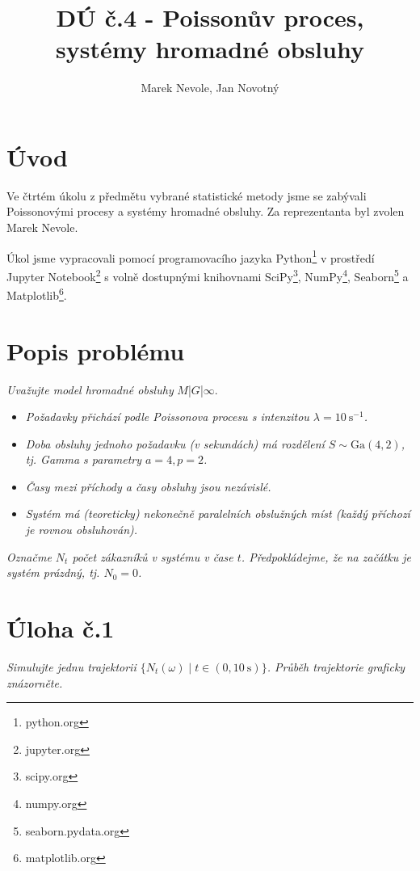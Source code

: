 \documentclass[czech]{mvi-report}
\title{DÚ č.4 - Poissonův proces, systémy hromadné obsluhy}
\author{Marek Nevole, Jan Novotný}
\affiliation{ČVUT - FIT}
\begin{document}
\maketitle

\section{Úvod}
Ve čtrtém úkolu z předmětu vybrané statistické metody jsme se zabývali Poissonovými procesy a systémy hromadné obsluhy. Za reprezentanta byl zvolen Marek Nevole.

Úkol jsme vypracovali pomocí programovacího jazyka Python\footnote{python.org} v prostředí Jupyter Notebook\footnote{jupyter.org} s volně dostupnými knihovnami SciPy\footnote{scipy.org}, NumPy\footnote{numpy.org}, Seaborn\footnote{seaborn.pydata.org} a Matplotlib\footnote{matplotlib.org}.

\section{Popis problému}
\textit{Uvažujte model hromadné obsluhy} $M$|$G$|$\infty$.
\begin{itemize}
  \item \textit{Požadavky přichází podle Poissonova procesu s intenzitou $\lambda = 10~\mathrm{s}^{-1}$.}
  \item \textit{Doba obsluhy jednoho požadavku (v sekundách) má rozdělení $S\sim\mathrm{Ga}(4,2)$, tj. Gamma s parametry $a = 4, p = 2$.}
  \item \textit{Časy mezi příchody a časy obsluhy jsou nezávislé.}
  \item \textit{Systém má (teoreticky) nekonečně paralelních obslužných míst (každý příchozí je rovnou obsluhován).}
\end{itemize}
\textit{Označme $N_t$ počet zákazníků v systému v čase $t$. Předpokládejme, že na začátku je systém prázdný, tj. $N_0 = 0$.}


\section{Úloha č.1}
\textit{Simulujte jednu trajektorii $\{N_t(\omega) \mid t\in(0,10~\mathrm{s})\}$. Průběh trajektorie graficky znázorněte.}\\
\end{document}
